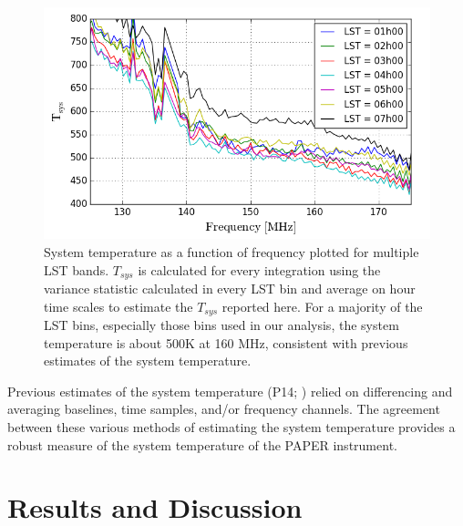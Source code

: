\documentclass[twocolumn,numberedappendix]{emulateapj} \shorttitle{PSA64}
\begin{document}
\begin{figure}[b!]\centering
\includegraphics[width=\columnwidth]{plots/tsys.png}
\caption{System temperature as a function of frequency plotted for multiple LST
bands. $T_{sys}$ is calculated for every integration using the variance
statistic calculated in every LST bin and average on hour time scales to
estimate the $T_{sys}$ reported here. For a majority of the LST bins, especially
those bins used in our analysis, the system temperature is about 500K at 160
MHz, consistent with previous estimates of the system temperature.}
\label{fig:tsys}
\end{figure}
Previous estimates of the system temperature
(P14; \citealt{jacobs_et_al2014}) relied on differencing and averaging
baselines, time samples, and/or frequency channels. The agreement between these
various methods of estimating the system temperature provides a robust measure
of the system temperature of the PAPER instrument. 


\section{Results and Discussion}\label{sec:results}
\end{document}
